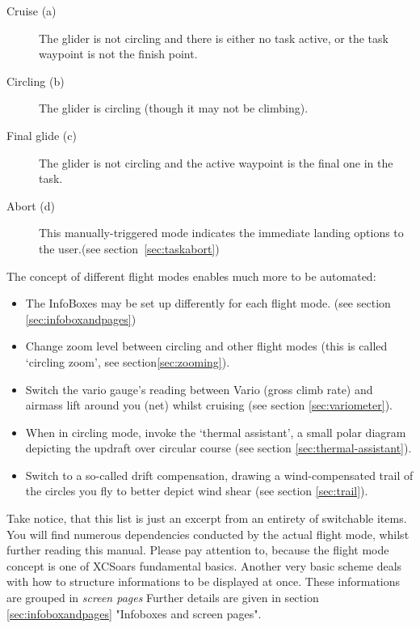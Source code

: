 \begin{description}
\item[Cruise (a)]   The glider is not circling and there is either no 
task active, or the task waypoint is not the finish point.
\item[Circling (b)]  The glider is circling (though it may not be climbing).
\item[Final glide (c)]  The glider is not circling and the active waypoint 
is the final one in the task.
\item[Abort (d)]  This manually-triggered mode indicates the immediate 
landing options to the user.(see section~\ref{sec:taskabort})
\end{description}

The concept of different flight modes enables much more to be automated:
\begin{itemize}
\item {} The InfoBoxes may be set up differently for 
each flight mode. (see section \ref{sec:infoboxandpages})
\item {} Change zoom level between circling and other 
flight modes (this is called `circling zoom', see section\ref{sec:zooming}).
\item {} Switch the vario gauge's reading between Vario 
(gross climb rate) and airmass lift around you (net) whilst cruising 
(see section \ref{sec:variometer}).
\item {} When in circling mode, invoke the 
`thermal assistant', a small polar diagram depicting the updraft over 
circular course (see section \ref{sec:thermal-assistant}).
\item {} Switch to a so-called drift compensation, 
drawing a wind-compensated trail of the circles you fly to better depict 
wind shear (see section \ref{sec:trail}). 
\end{itemize}

Take notice, that this list is just an excerpt from an entirety of 
switchable items. You will find numerous dependencies conducted by the 
actual flight mode, whilst further reading this manual. Please pay 
attention to, because the flight mode concept is one of XCSoars 
fundamental basics. Another very basic scheme deals with how to structure 
informations to be displayed at once. These informations are grouped in 
\emph{screen pages} Further details are given in section 
\ref{sec:infoboxandpages} "Infoboxes and screen pages".



